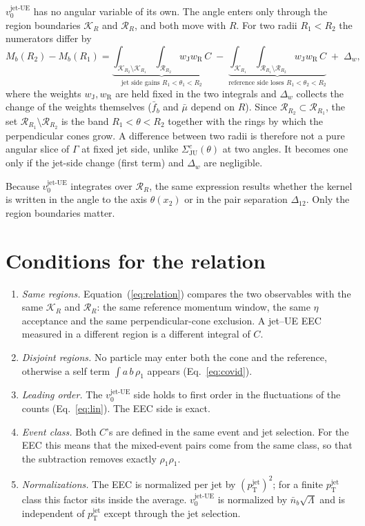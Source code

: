 \documentclass[11pt,a4paper]{article}
\newcommand{\vjet}{v_0^{\mathrm{jet\text{-}UE}}}
\newcommand{\K}{\mathcal{K}_R}
\newcommand{\Rr}{\mathcal{R}_R}
\newcommand{\pjet}{p_\mathrm{T}^\mathrm{jet}}
\begin{document}
$\vjet$ has no angular variable of its own. The angle enters only through the region boundaries $\K$ and $\Rr$, and both move with $R$. For two radii $R_1<R_2$ the numerators differ by
\begin{equation}
M_b(R_2)-M_b(R_1)=
\underbrace{\int_{\mathcal{K}_{R_2}\setminus\mathcal{K}_{R_1}}\!\int_{\mathcal{R}_{R_2}}w_\mathrm{J}w_\mathrm{R}\,C}_{\text{jet side gains }R_1<\theta_1<R_2}
\;-\;\underbrace{\int_{\mathcal{K}_{R_1}}\!\int_{\mathcal{R}_{R_1}\setminus\mathcal{R}_{R_2}}w_\mathrm{J}w_\mathrm{R}\,C}_{\text{reference side loses }R_1<\theta_2<R_2}
\;+\;\Delta_{w},
\label{eq:dR}
\end{equation}
where the weights $w_\mathrm{J},w_\mathrm{R}$ are held fixed in the two integrals and $\Delta_w$ collects the change of the weights themselves ($\bar f_b$ and $\bar\mu$ depend on $R$). Since $\mathcal{R}_{R_2}\subset\mathcal{R}_{R_1}$, the set $\mathcal{R}_{R_1}\setminus\mathcal{R}_{R_2}$ is the band $R_1<\theta<R_2$ together with the rings by which the perpendicular cones grow. A difference between two radii is therefore not a pure angular slice of $\Gamma$ at fixed jet side, unlike $\Sigma^{c}_\mathrm{JU}(\theta)$ at two angles. It becomes one only if the jet-side change (first term) and $\Delta_w$ are negligible.

Because $\vjet$ integrates over $\Rr$, the same expression results whether the kernel is written in the angle to the axis $\theta(x_2)$ or in the pair separation $\Delta_{12}$. Only the region boundaries matter.

\section{Conditions for the relation}
\label{sec:conditions}

\begin{enumerate}
\item \emph{Same regions.} Equation~(\ref{eq:relation}) compares the two observables with the same $\K$ and $\Rr$: the same reference momentum window, the same $\eta$ acceptance and the same perpendicular-cone exclusion. A jet--UE EEC measured in a different region is a different integral of $C$.
\item \emph{Disjoint regions.} No particle may enter both the cone and the reference, otherwise a self term $\int a\,b\,\rho_1$ appears (Eq.~\ref{eq:covid}).
\item \emph{Leading order.} The $\vjet$ side holds to first order in the fluctuations of the counts (Eq.~\ref{eq:lin}). The EEC side is exact.
\item \emph{Event class.} Both $C$'s are defined in the same event and jet selection. For the EEC this means that the mixed-event pairs come from the same class, so that the subtraction removes exactly $\rho_1\rho_1$.
\item \emph{Normalizations.} The EEC is normalized per jet by $(\pjet)^2$; for a finite $\pjet$ class this factor sits inside the average. $\vjet$ is normalized by $\bar n_b\sqrt\Lambda$ and is independent of $\pjet$ except through the jet selection.
\end{enumerate}
\end{document}
